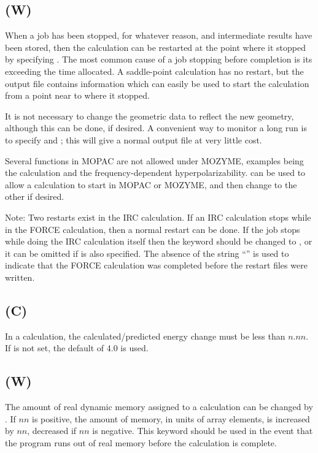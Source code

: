 \subsection*{ (W)}
        When a job has been stopped, for whatever reason,  and  intermediate
   results  have  been  stored, then the calculation can be restarted at the
   point where it stopped by specifying .  The most common cause of a
   job  stopping  before  completion is its exceeding the time allocated.  A
   saddle-point calculation has no restart, but  the  output  file  contains
   information  which  can  easily  be  used to start the calculation from a
   point near to where it stopped.

        It is not necessary to change the geometric data to reflect the  new
   geometry, although this can be done, if desired.
A convenient way to monitor a  long  run  is  to  specify    and
   ; this will give a normal output file at very little cost.

Several functions in MOPAC are not allowed under MOZYME, examples being the
 calculation and the frequency-dependent hyperpolarizability.
 can be used to allow a calculation to start in MOPAC or MOZYME,
 and then change to the other if desired.

Note:  Two restarts exist in the IRC calculation.  If an  IRC
   calculation  stops  while in the FORCE calculation, then a normal restart
   can be done.  If the job stops while doing  the  IRC  calculation  itself
   then  the keyword  should be changed to , or it can be omitted if
    is also specified.  The absence of  the  string  ``''  is  used  to
   indicate  that  the  FORCE  calculation  was completed before the restart
   files were written.

\subsection*{ (C)}
In a  calculation, the calculated/predicted energy change must be less
than $n.nn$.  If  is not set, the default of 4.0 is used.

\subsection*{ (W)}
The amount of real dynamic memory assigned to a calculation can be changed
by .  If $nn$ is positive, the amount of memory, in units of
array elements, is increased by $nn$, decreased if $nn$ is negative.  This
keyword should be used in the event that the program runs out of real memory before
the calculation is complete.


